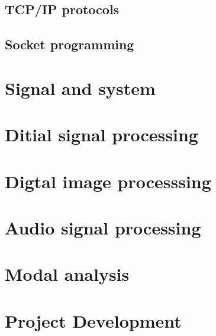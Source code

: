 \documentclass[12pt,a4paper,UTF8]{ctexbook}
\begin{document}
	\chapter{TCP/IP protocols}
	\chapter{Socket programming}
	
	
	\part{Signal and system}
	
	\part{Ditial signal processing}
	\begin{comment} 
	rather stupid, but helpful 
	\chapter{FFT}
	\chapter{FIR}
	\chapter{IIR}
	\end{comment}

	
	\part{Digtal image processsing}
	
	\part{Audio signal processing}
	
	\part{Modal analysis}	
	
	\part{Project Development}
	
	\begin{comment} 
	rather stupid, but helpful 
	\chapter{8-channel data acquistion system design}
	\chapter{32-channel data acquistion system design}
	\chapter{64-channel data acquistion system design}
	\end{comment}
\end{document}
